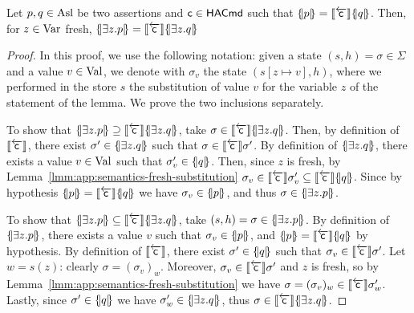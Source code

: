 \begin{lemma}\label{lmm:app:separation-sil-exist-wp}
	Let $p, q \in \Asl$ be two assertions and $\regc \in \Cmdh$ such that $\asldenot{p} = \bwsem{\regc} \asldenot{q}$. Then, for $z \in \Var$ fresh, $\asldenot{\exists z . p} = \bwsem{\regc} \asldenot{\exists z . q}$
\end{lemma}
\begin{proof}
	In this proof, we use the following notation: given a state $(s, h) = \sigma \in \Sigma$ and a value $v \in \Val$, we denote with $\sigma_v$ the state $(s[z \mapsto v], h)$, where we performed in the store $s$ the substitution of value $v$ for the variable $z$ of the statement of the lemma.
	We prove the two inclusions separately.

	To show that $\asldenot{\exists z . p} \supseteq \bwsem{\regc} \asldenot{\exists z . q}$, take $\sigma \in \bwsem{\regc} \asldenot{\exists z . q}$. Then, by definition of $\bwsem{\regc}$, there exist $\sigma' \in \asldenot{\exists z . q}$ such that $\sigma \in \bwsem{\regc} \sigma'$. By definition of $\asldenot{\exists z . q}$, there exists a value $v \in \Val$ such that $\sigma'_v \in \asldenot{q}$. Then, since $z$ is fresh, by Lemma~\ref{lmm:app:semantics-fresh-substitution} $\sigma_v \in \bwsem{\regc} \sigma'_v \subseteq \bwsem{\regc} \asldenot{q}$.
	Since by hypothesis $\asldenot{p} = \bwsem{\regc} \asldenot{q}$ we have $\sigma_v \in \asldenot{p}$, and thus $\sigma \in \asldenot{\exists z . p}$.

	To show that $\asldenot{\exists z . p} \subseteq \bwsem{\regc} \asldenot{\exists z . q}$, take $(s, h) = \sigma \in \asldenot{\exists z . p}$. By definition of $\asldenot{\exists z . p}$, there exists a value $v$ such that $\sigma_v \in \asldenot{p}$, and $\asldenot{p} = \bwsem{\regc} \asldenot{q}$ by hypothesis. By definition of $\bwsem{\regc}$, there exist $\sigma' \in \asldenot{q}$ such that $\sigma_v \in \bwsem{\regc} \sigma'$. Let $w = s(z)$: clearly $\sigma = (\sigma_v)_w$. Moreover, $\sigma_v \in \bwsem{\regc} \sigma'$ and $z$ is fresh, so by Lemma~\ref{lmm:app:semantics-fresh-substitution} we have $\sigma = (\sigma_v)_w \in \bwsem{\regc} \sigma'_w$. Lastly, since $\sigma' \in \asldenot{q}$ we have $\sigma'_w \in \asldenot{\exists z . q}$, thus $\sigma \in \bwsem{\regc} \asldenot{\exists z . q}$.
\end{proof}

